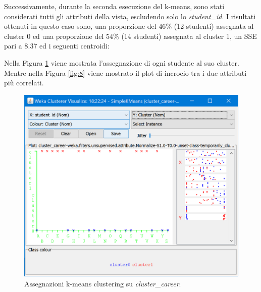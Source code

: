 \documentclass[]{article}
\begin{document}
Successivamente, durante la seconda esecuzione del k-means, sono stati considerati tutti gli attributi della vista, escludendo solo lo \textit{student\_id}. I risultati ottenuti in questo caso sono, una proporzione del $46\%$ (12 studenti) assegnata al cluster 0 ed una proporzione del $54\%$ (14 studenti) assegnata al cluster 1, un SSE pari a $8.37$ ed i seguenti centroidi:

\begin{center}
\end{center}

Nella Figura \ref{fig:7} viene mostrata l'assegnazione di ogni studente al suo cluster. Mentre nella Figura \ref{fig:8} viene mostrato il plot di incrocio tra i due attributi pi\`{u} correlati.

\begin{figure}[!]
	\centering
	\includegraphics[scale=0.6]{Img/kmeans_career_allAttributi_assegnamenti.png}
	\caption{Assegnazioni k-means clustering su \textit{cluster\_career}.
		\label{fig:7}}
\end{figure} 
\end{document}
